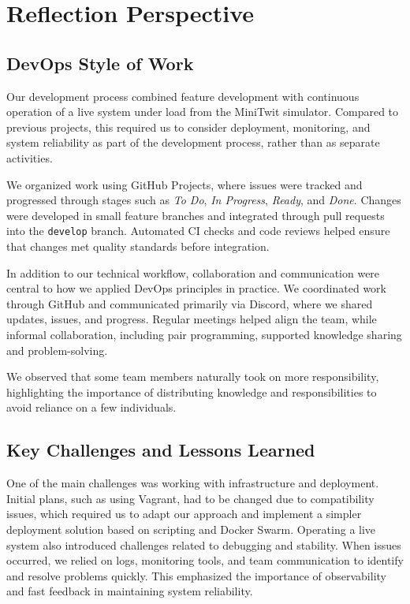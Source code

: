 \section{Reflection Perspective}

\subsection{DevOps Style of Work}

Our development process combined feature development with continuous operation of a live system under load from the MiniTwit simulator. Compared to previous projects, this required us to consider deployment, monitoring, and system reliability as part of the development process, rather than as separate activities.

We organized work using GitHub Projects, where issues were tracked and progressed through stages such as \textit{To Do}, \textit{In Progress}, \textit{Ready}, and \textit{Done}. Changes were developed in small feature branches and integrated through pull requests into the \texttt{develop} branch. Automated CI checks and code reviews helped ensure that changes met quality standards before integration.

In addition to our technical workflow, collaboration and communication were central to how we applied DevOps principles in practice. We coordinated work through GitHub and communicated primarily via Discord, where we shared updates, issues, and progress. Regular meetings helped align the team, while informal collaboration, including pair programming, supported knowledge sharing and problem-solving.

We observed that some team members naturally took on more responsibility, highlighting the importance of distributing knowledge and responsibilities to avoid reliance on a few individuals.

\subsection{Key Challenges and Lessons Learned}

One of the main challenges was working with infrastructure and deployment. Initial plans, such as using Vagrant, had to be changed due to compatibility issues, which required us to adapt our approach and implement a simpler deployment solution based on scripting and Docker Swarm. Operating a live system also introduced challenges related to debugging and stability. When issues occurred, we relied on logs, monitoring tools, and team communication to identify and resolve problems quickly. This emphasized the importance of observability and fast feedback in maintaining system reliability.

